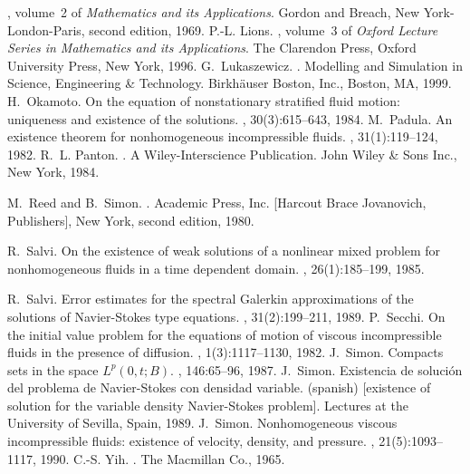 \documentclass[11pt,a4paper]{article}
\begin{document}
\begin{thebibliography}{10}
,
  volume~2 of {\em Mathematics and its Applications}.
\newblock Gordon and Breach, New York-London-Paris, second edition, 1969.
P.-L. Lions.
, volume~3 of {\em Oxford Lecture Series in Mathematics and its
  Applications}.
\newblock The Clarendon Press, Oxford University Press, New York, 1996.
G.~Lukaszewicz.
.
\newblock Modelling and Simulation in Science, Engineering \& Technology.
  Birkh{\"{a}}user Boston, Inc., Boston, MA, 1999.
H.~Okamoto.
\newblock On the equation of nonstationary stratified fluid motion: uniqueness
  and existence of the solutions.
, 30(3):615--643, 1984.
M.~Padula.
\newblock An existence theorem for nonhomogeneous incompressible fluids.
, 31(1):119--124, 1982.
R.~L. Panton.
.
\newblock A Wiley-Interscience Publication. John Wiley \& Sons Inc., New York,
  1984.
  
M.~Reed and B.~Simon.
.
\newblock Academic Press, Inc. [Harcout Brace Jovanovich, Publishers], New
  York, second edition, 1980.
  
R.~Salvi.
\newblock On the existence of weak solutions of a nonlinear mixed problem for
  nonhomogeneous fluids in a time dependent domain.
, 26(1):185--199, 1985.

R.~Salvi.
\newblock Error estimates for the spectral {G}alerkin approximations of the
  solutions of {N}avier-{S}tokes type equations.
, 31(2):199--211, 1989.
P.~Secchi.
\newblock On the initial value problem for the equations of motion of viscous
  incompressible fluids in the presence of diffusion.
, 1(3):1117--1130, 1982.
J.~Simon.
\newblock Compacts sets in the space ${L}^p (0,t;{B})$.
, 146:65--96, 1987.
J.~Simon.
\newblock Existencia de soluci\'on del problema de {N}avier-{S}tokes con
  densidad variable. (spanish) [existence of solution for the variable density
  {N}avier-{S}tokes problem].
\newblock Lectures at the University of Sevilla, Spain, 1989.
J.~Simon.
\newblock Nonhomogeneous viscous incompressible fluids: existence of velocity,
  density, and pressure.
, 21(5):1093--1117, 1990.
C.-S. Yih.
.
\newblock The Macmillan Co., 1965.
\end{thebibliography}
\end{document}
